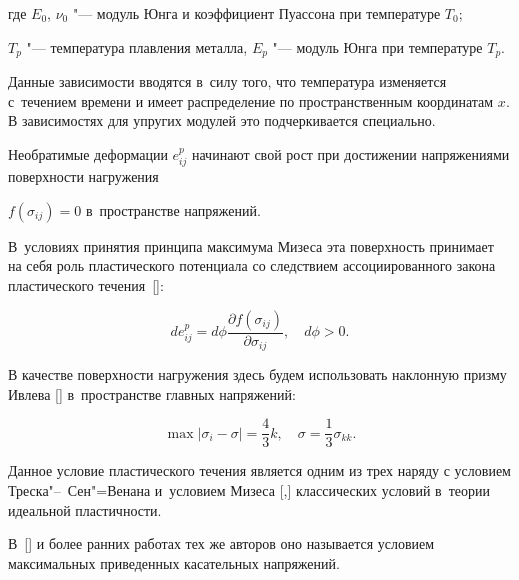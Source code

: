 где  $E_{0} $, $\nu _{0} $ "--- модуль Юнга и коэффициент Пуассона при температуре $T_{0} $;

$T_{p} $ "--- температура плавления металла, $E_{p} $ "--- модуль Юнга при температуре  $T_{p} $. 

Данные зависимости вводятся в~силу того, что температура изменяется с~течением времени и имеет распределение по пространственным координатам $x$. В зависимостях для упругих модулей это подчеркивается специально.





Необратимые деформации $e_{ij}^{p} $ начинают свой рост при достижении напряжениями поверхности нагружения 

$f(\sigma _{ij} )=0$ в~пространстве напряжений. 

В~условиях принятия принципа максимума Мизеса эта поверхность принимает на себя роль пластического потенциала со следствием ассоциированного закона пластического течения~[]:



\begin{equation} \label{eq:ulg:4} 

de_{ij}^{p} =d\phi \frac{\partial f(\sigma _{ij} )}{\partial \sigma _{ij} } , \quad  

d\phi >0.

\end{equation} 





В качестве поверхности нагружения здесь  будем использовать наклонную призму Ивлева [] в~пространстве главных напряжений:

\begin{equation} 

\label{eq:ulg:5} 

\max |\sigma _{i} -\sigma |=\frac{4}{3} k, \quad 

\sigma =\frac{1}{3} \sigma _{kk} . 

\end{equation} 



Данное условие пластического течения является одним из трех  наряду с условием Треска"--~Сен"=Венана и~условием Мизеса [,] классических условий в~теории идеальной пластичности. 

В~[] и более ранних работах тех же авторов оно называется условием максимальных приведенных касательных напряжений. 

